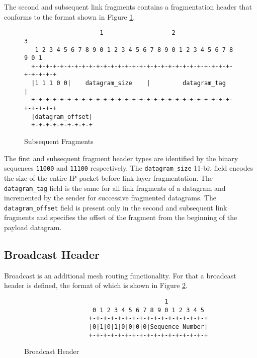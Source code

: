 \documentclass[12pt, titlepage, a4paper]{report}
\newenvironment{mylisting}
{\begin{list}{}{\setlength{\leftmargin}{1em}}\item\footnotesize}
{\end{list}}
\begin{document}
The second and subsequent link fragments contains a fragmentation header that conforms to the format shown in Figure \ref{fig:sub.fragment}.

\begin{figure}[htp]
\centering
\begin{mylisting}
\begin{verbatim}
                     1                   2                   3
   1 2 3 4 5 6 7 8 9 0 1 2 3 4 5 6 7 8 9 0 1 2 3 4 5 6 7 8 9 0 1
  +-+-+-+-+-+-+-+-+-+-+-+-+-+-+-+-+-+-+-+-+-+-+-+-+-+-+-+-+-+-+-+-+
  |1 1 1 0 0|    datagram_size    |         datagram_tag          |
  +-+-+-+-+-+-+-+-+-+-+-+-+-+-+-+-+-+-+-+-+-+-+-+-+-+-+-+-+-+-+-+-+
  |datagram_offset|
  +-+-+-+-+-+-+-+-+
\end{verbatim}
\end{mylisting}
\caption{Subsequent Fragments}\label{fig:sub.fragment}
\end{figure}

The first and subsequent fragment header types are identified by the binary sequences \texttt{11000} and \texttt{11100} respectively.  The  \texttt{datagram\_size} 11-bit field encodes the size of the entire IP packet before link-layer fragmentation.  The \texttt{datagram\_tag} field is the same for all link fragments of a datagram and incremented by the sender for successive fragmented datagrams. The \texttt{datagram\_offset} field is present only in the second and subsequent link fragments and specifies the offset of the fragment from the beginning of the payload datagram.

\subsection{Broadcast Header}\label{subsec:broad.header}
Broadcast is an additional mesh routing functionality. For that a broadcast header is defined, the format of which is shown in Figure \ref{fig:broad.header}.
\begin{figure}[htp]
\begin{mylisting}
\begin{verbatim}
                                       1
                   0 1 2 3 4 5 6 7 8 9 0 1 2 3 4 5
                  +-+-+-+-+-+-+-+-+-+-+-+-+-+-+-+-+
                  |0|1|0|1|0|0|0|0|Sequence Number|
                  +-+-+-+-+-+-+-+-+-+-+-+-+-+-+-+-+
\end{verbatim}
\end{mylisting}
\caption{Broadcast Header
}\label{fig:broad.header}
\end{figure}
\end{document}

